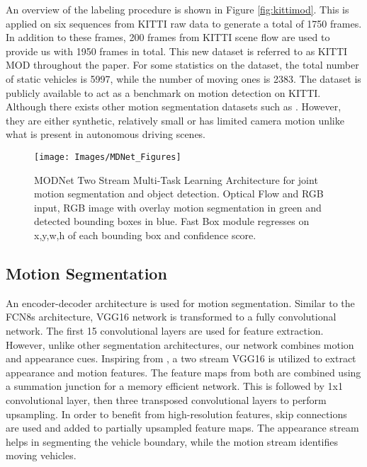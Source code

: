 \documentclass[letterpaper, 10 pt, conference]{ieeeconf}  %
\begin{document}
An overview of the labeling procedure is shown in Figure \ref{fig:kittimod}. This is applied on six sequences from KITTI raw data \cite{Geiger2013IJRR} to generate a total of 1750 frames. In addition to these frames, 200 frames from KITTI scene flow are used to provide us with 1950 frames in total. This new dataset is referred to as KITTI MOD throughout the paper. For some statistics on the dataset, the total number of static vehicles is 5997, while the number of moving ones is 2383. The dataset is publicly available \cite{multimenna} to act as a benchmark on motion detection on KITTI. Although there exists other motion segmentation datasets such as \cite{perazzi2016}\cite{mayer2016large}\cite{ochs2014segmentation}. However, they are either synthetic\cite{mayer2016large}, relatively small \cite{ochs2014segmentation} or has limited camera motion \cite{perazzi2016} unlike what is present in autonomous driving scenes.
\begin{figure*}[ht!]
    \centering
    \texttt{[image: Images/MDNet\_Figures]}
    \caption{MODNet Two Stream Multi-Task Learning Architecture for joint motion segmentation and object detection. Optical Flow and RGB input, RGB image with overlay motion segmentation in green and detected bounding boxes in blue. Fast Box module regresses on x,y,w,h of each bounding box and confidence score.}
    \label{fig:2st}
\end{figure*}\subsection{Motion Segmentation}
An encoder-decoder architecture is used for motion segmentation. Similar to the FCN8s \cite{long2015fully} architecture, VGG16 network is transformed to a fully convolutional network. The first 15 convolutional layers are used for feature extraction. However, unlike other segmentation architectures, our network combines motion and appearance cues. Inspiring from \cite{simonyan2014two}\cite{jain2017fusionseg}, a two stream VGG16 is utilized to extract appearance and motion features. The feature maps from both are combined using a summation junction for a memory efficient network. This is followed by 1x1 convolutional layer, then three transposed convolutional layers to perform upsampling. In order to benefit from high-resolution features, skip connections are used and added to partially upsampled feature maps. The appearance stream helps in segmenting the vehicle boundary, while the motion stream identifies moving vehicles.
\end{document}
